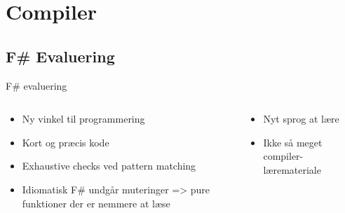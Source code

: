 \section{Compiler}

\subsection{F\# Evaluering}
\begin{frame}{F\# evaluering}
  \begin{columns}
    \begin{column}{.5\textwidth}
      \begin{itemize}
        \item Ny vinkel til programmering
        \item Kort og præcis kode
        \item Exhaustive checks ved pattern matching
        \item Idiomatisk F\# undgår muteringer => pure funktioner der er nemmere at læse
      \end{itemize}
    \end{column}
    
    \begin{column}{.5\textwidth}
      \begin{itemize}
        \item Nyt sprog at lære
        \item Ikke så meget compiler-læremateriale
      \end{itemize}
    \end{column}
  \end{columns}
\end{frame}

